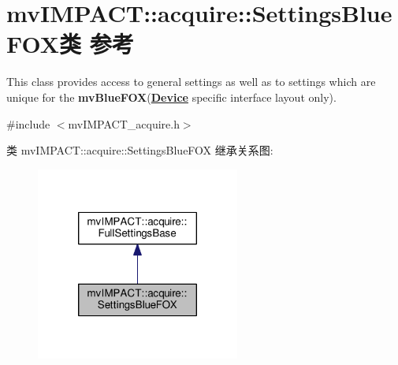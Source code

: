 \hypertarget{classmv_i_m_p_a_c_t_1_1acquire_1_1_settings_blue_f_o_x}{\section{mv\+I\+M\+P\+A\+C\+T\+:\+:acquire\+:\+:Settings\+Blue\+F\+O\+X类 参考}
\label{classmv_i_m_p_a_c_t_1_1acquire_1_1_settings_blue_f_o_x}
}


This class provides access to general settings as well as to settings which are unique for the {\bfseries mv\+Blue\+F\+O\+X}({\bfseries \hyperlink{classmv_i_m_p_a_c_t_1_1acquire_1_1_device}{Device}} specific interface layout only).  




{\ttfamily \#include $<$mv\+I\+M\+P\+A\+C\+T\+\_\+acquire.\+h$>$}



类 mv\+I\+M\+P\+A\+C\+T\+:\+:acquire\+:\+:Settings\+Blue\+F\+O\+X 继承关系图\+:
\nopagebreak
\begin{figure}[H]
\begin{center}
\leavevmode
\includegraphics[width=190pt]{classmv_i_m_p_a_c_t_1_1acquire_1_1_settings_blue_f_o_x__inherit__graph}
\end{center}
\end{figure}


